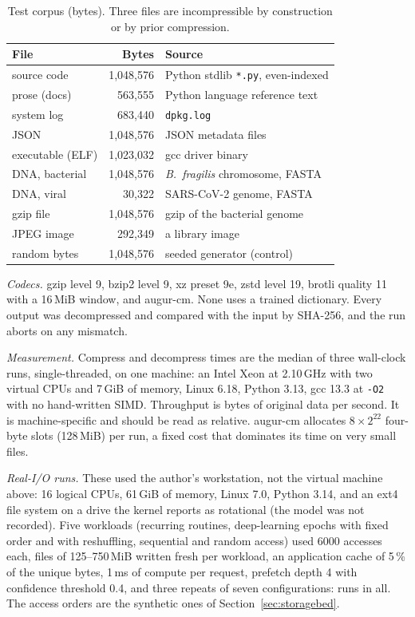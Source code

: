 \documentclass[conference]{IEEEtran}
\newcommand{\cm}{\textsf{augur-cm}}
\begin{document}
\begin{table}[t]
\caption{Test corpus (bytes). Three files are incompressible by construction or by prior compression.}
\label{tab:corpus}
\centering\scriptsize
\begin{tabular}{@{}lrl@{}}
\toprule
File & Bytes & Source \\
\midrule
source code & 1,048,576 & Python stdlib \texttt{*.py}, even-indexed \\
prose (docs) & 563,555 & Python language reference text \\
system log & 683,440 & \texttt{dpkg.log} \\
JSON & 1,048,576 & JSON metadata files \\
executable (ELF) & 1,023,032 & gcc driver binary \\
DNA, bacterial & 1,048,576 & \emph{B.\ fragilis} chromosome, FASTA \\
DNA, viral & 30,322 & SARS-CoV-2 genome, FASTA \\
gzip file & 1,048,576 & gzip of the bacterial genome \\
JPEG image & 292,349 & a library image \\
random bytes & 1,048,576 & seeded generator (control) \\
\bottomrule
\end{tabular}
\end{table}

\emph{Codecs.} gzip level 9, bzip2 level 9, xz preset 9e, zstd level 19, brotli quality 11 with a 16\,MiB window, and \cm. None uses a trained dictionary. Every output was decompressed and compared with the input by SHA-256, and the run aborts on any mismatch.

\emph{Measurement.} Compress and decompress times are the median of three wall-clock runs, single-threaded, on one machine: an Intel Xeon at 2.10\,GHz with two virtual CPUs and 7\,GiB of memory, Linux 6.18, Python 3.13, gcc 13.3 at \texttt{-O2} with no hand-written SIMD. Throughput is bytes of original data per second. It is machine-specific and should be read as relative. \cm{} allocates $8\times2^{22}$ four-byte slots (128\,MiB) per run, a fixed cost that dominates its time on very small files.

\emph{Real-I/O runs.} These used the author's workstation, not the virtual machine above: 16 logical CPUs, 61\,GiB of memory, Linux 7.0, Python 3.14, and an ext4 file system on a drive the kernel reports as rotational (the model was not recorded). Five workloads (recurring routines, deep-learning epochs with fixed order and with reshuffling, sequential and random access) used 6000 accesses each, files of 125--750\,MiB written fresh per workload, an application cache of 5\,\% of the unique bytes, 1\,ms of compute per request, prefetch depth 4 with confidence threshold 0.4, and three repeats of seven configurations: \realRuns{} runs in all. The access orders are the synthetic ones of Section~\ref{sec:storagebed}.
\end{document}
